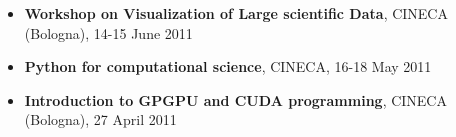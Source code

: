 \documentclass[helvetica,narrow,openbib]{europecv}
\renewcommand{\emph}[1]{\textbf{#1}}
\begin{document}
\begin{europecv}
{\begin{itemize}
 \item \emph{Workshop on Visualization of Large scientific Data}, CINECA (Bologna), 14-15 June
2011 

 \item \emph{Python for computational science}, CINECA, 16-18 May 2011

\item \emph{Introduction to GPGPU and CUDA
programming}, CINECA (Bologna), 27 April 2011
\end{itemize}
}






\end{europecv}
\end{document}
